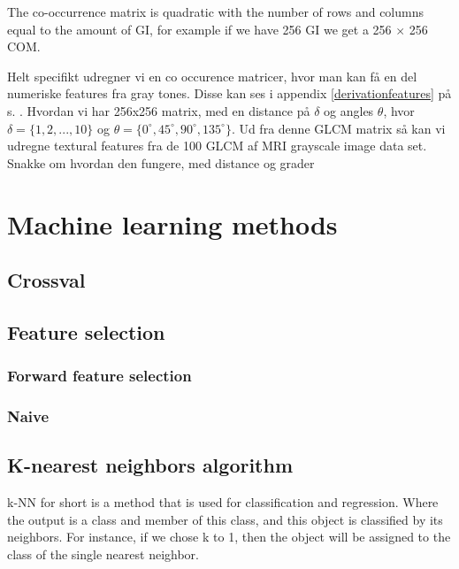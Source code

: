 The co-occurrence matrix is quadratic with the number of rows and columns equal to the amount of GI, for example if we have 256 GI we get a 256 $\times$ 256 COM.







Helt specifikt udregner vi en co occurence matricer, hvor man kan få en del numeriske features fra gray tones. Disse kan ses i appendix \ref{derivationfeatures} på s. \pageref{derivationfeatures}.
Hvordan vi har 256x256 matrix, med en distance på $\delta$ og angles $\theta$, hvor $\delta = \{1,2,...,10\}$ og $\theta = \{0^\circ, 45^\circ, 90^\circ, 135^\circ\}$.
Ud fra denne GLCM matrix så kan vi udregne textural features fra de 100 GLCM af MRI grayscale image data set.
Snakke om hvordan den fungere, med distance og grader






\section{Machine learning methods}

\subsection{Crossval}

\subsection{Feature selection}

\subsubsection{Forward feature selection}

\subsubsection{Naive}



\subsection{K-nearest neighbors algorithm}

k-NN for short is a method that is used for classification and regression. Where the output is a class and member of this class, and this object is classified by its neighbors. For instance, if we chose k to 1, then the object will be assigned to the class of the single nearest neighbor.

